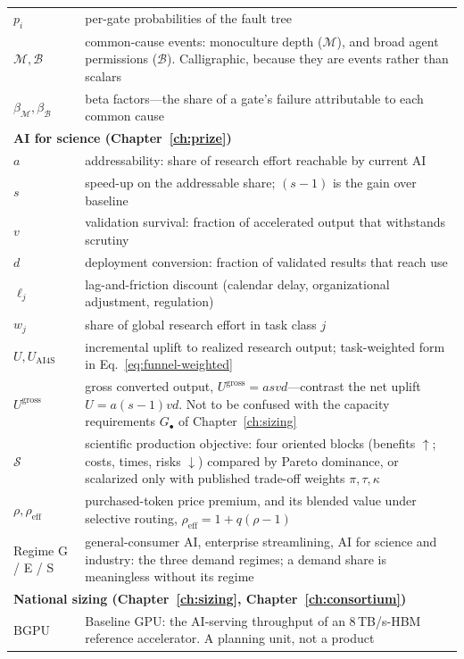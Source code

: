 \begin{longtable}{p{26mm}p{112mm}}
$p_i$ & per-gate probabilities of the fault tree \\
$\mathcal{M}, \mathcal{B}$ & common-cause events: monoculture depth ($\mathcal{M}$), and broad agent permissions ($\mathcal{B}$). Calligraphic, because they are events rather than scalars \\
$\beta_{\mathcal{M}}, \beta_{\mathcal{B}}$ & beta factors---the share of a gate's failure attributable to each common cause \\
\midrule
\multicolumn{2}{l}{\textbf{AI for science (Chapter~\ref{ch:prize})}} \\
\midrule
$a$ & addressability: share of research effort reachable by current AI \\
$s$ & speed-up on the addressable share; $(s{-}1)$ is the gain over baseline \\
$v$ & validation survival: fraction of accelerated output that withstands scrutiny \\
$d$ & deployment conversion: fraction of validated results that reach use \\
$\ell_j$ & lag-and-friction discount (calendar delay, organizational adjustment, regulation) \\
$w_j$ & share of global research effort in task class $j$ \\
$U, U_{\mathrm{AI4S}}$ & incremental uplift to realized research output; task-weighted form in Eq.~\ref{eq:funnel-weighted} \\
$U^{\mathrm{gross}}$ & gross converted output, $U^{\mathrm{gross}} = asvd$---contrast the net uplift $U = a(s{-}1)vd$. Not to be confused with the capacity requirements $G_{\bullet}$ of Chapter~\ref{ch:sizing} \\
$\boldsymbol{\mathcal{S}}$ & scientific production objective: four oriented blocks (benefits $\uparrow$; costs, times, risks $\downarrow$) compared by Pareto dominance, or scalarized only with published trade-off weights $\pi,\tau,\kappa$ \\
$\rho, \rho_{\mathrm{eff}}$ & purchased-token price premium, and its blended value under selective routing, $\rho_{\mathrm{eff}} = 1 + q(\rho-1)$ \\
Regime G / E / S & general-consumer AI, enterprise streamlining, AI for science and industry: the three demand regimes; a demand share is meaningless without its regime \\
\midrule
\multicolumn{2}{l}{\textbf{National sizing (Chapter~\ref{ch:sizing}, Chapter~\ref{ch:consortium})}} \\
\midrule
BGPU & Baseline GPU: the AI-serving throughput of an 8\,TB/s-HBM reference accelerator. A planning unit, not a product \\

\end{longtable}
